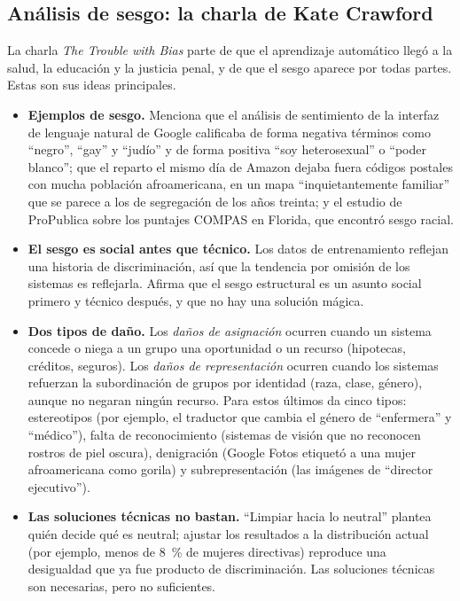 \documentclass[11pt,letterpaper]{article}
\begin{document}
\subsection{Análisis de sesgo: la charla de Kate Crawford}

La charla \textit{The Trouble with Bias} \parencite{crawford2017} parte de que el aprendizaje automático llegó a la salud, la educación y la justicia penal, y de que el sesgo aparece por todas partes. Estas son sus ideas principales.

\begin{itemize}
    \item \textbf{Ejemplos de sesgo.} Menciona que el análisis de sentimiento de la interfaz de lenguaje natural de Google calificaba de forma negativa términos como ``negro'', ``gay'' y ``judío'' y de forma positiva ``soy heterosexual'' o ``poder blanco''; que el reparto el mismo día de Amazon dejaba fuera códigos postales con mucha población afroamericana, en un mapa ``inquietantemente familiar'' que se parece a los de segregación de los años treinta; y el estudio de ProPublica sobre los puntajes COMPAS en Florida, que encontró sesgo racial.
    \item \textbf{El sesgo es social antes que técnico.} Los datos de entrenamiento reflejan una historia de discriminación, así que la tendencia por omisión de los sistemas es reflejarla. Afirma que el sesgo estructural es un asunto social primero y técnico después, y que no hay una solución mágica.
    \item \textbf{Dos tipos de daño.} Los \emph{daños de asignación} ocurren cuando un sistema concede o niega a un grupo una oportunidad o un recurso (hipotecas, créditos, seguros). Los \emph{daños de representación} ocurren cuando los sistemas refuerzan la subordinación de grupos por identidad (raza, clase, género), aunque no negaran ningún recurso. Para estos últimos da cinco tipos: estereotipos (por ejemplo, el traductor que cambia el género de ``enfermera'' y ``médico''), falta de reconocimiento (sistemas de visión que no reconocen rostros de piel oscura), denigración (Google Fotos etiquetó a una mujer afroamericana como gorila) y subrepresentación (las imágenes de ``director ejecutivo'').
    \item \textbf{Las soluciones técnicas no bastan.} ``Limpiar hacia lo neutral'' plantea quién decide qué es neutral; ajustar los resultados a la distribución actual (por ejemplo, menos de 8~\% de mujeres directivas) reproduce una desigualdad que ya fue producto de discriminación. Las soluciones técnicas son necesarias, pero no suficientes.

\end{itemize}
\end{document}
